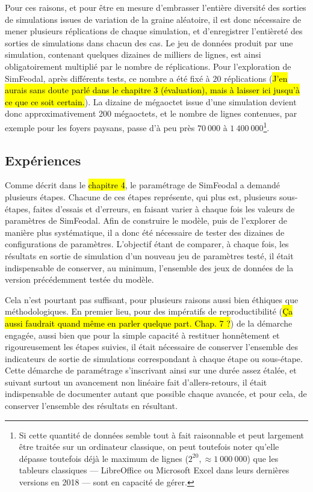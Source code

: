 	Pour ces raisons, et pour être en mesure d'embrasser l'entière diversité des sorties de simulations issues de variation de la graine aléatoire, il est donc nécessaire de mener plusieurs réplications de chaque simulation, et d'enregistrer l'entièreté des sorties de simulations dans chacun des cas.
	Le jeu de données produit par une simulation, contenant quelques dizaines de milliers de lignes, est ainsi obligatoirement multiplié par le nombre de réplications.
	Pour l'exploration de SimFeodal, après différents tests, ce nombre a été fixé à $20$ réplications (\hl{J'en aurais sans doute parlé dans le chapitre 3 (évaluation), mais à laisser ici jusqu'à ce que ce soit certain.}).
	La dizaine de mégaoctet issue d'une simulation devient donc approximativement 200 mégaoctets, et le nombre de lignes contenues, par exemple pour les foyers paysans, passe d'à peu près $70~000$ à $1~400~000$\footnote{
	Si cette quantité de données semble tout à fait raisonnable et peut largement être traitée sur un ordinateur classique, on peut toutefois noter qu'elle dépasse toutefois déjà le maximum de lignes ($2^{20}, \approx 1~000~000$) que les tableurs classiques ---
	LibreOffice ou Microsoft Excel dans leurs dernières versions en 2018
	--- sont en capacité de gérer.  
	}.

	\subsection{Expériences}

	Comme décrit dans le \hl{chapitre 4}, le paramétrage de SimFeodal a demandé plusieurs étapes.
	Chacune de ces étapes représente, qui plus est, plusieurs sous-étapes, faites d'essais et d'erreurs, en faisant varier à chaque fois les valeurs de paramètres de SimFeodal.
	Afin de construire le modèle, puis de l'explorer de manière plus systématique, il a donc été nécessaire de tester des dizaines de configurations de paramètres.
	L'objectif étant de comparer, à chaque fois, les résultats en sortie de simulation d'un nouveau jeu de paramètres testé, il était indispensable de conserver, au minimum, l'ensemble des jeux de données de la version précédemment testée du modèle.
	
	Cela n'est pourtant pas suffisant, pour plusieurs raisons aussi bien éthiques que méthodologiques.
	En premier lieu, pour des impératifs de reproductibilité (\hl{Ça aussi faudrait quand même en parler quelque part. Chap. 7 ?}) de la démarche engagée, aussi bien que pour la simple capacité à restituer honnêtement et rigoureusement les étapes suivies, il était nécessaire de conserver l'ensemble des indicateurs de sortie de simulations correspondant à chaque étape ou sous-étape.
	Cette démarche de paramétrage s'inscrivant ainsi sur une durée assez étalée, et suivant surtout un avancement non linéaire fait d'allers-retours, il était indispensable de documenter autant que possible chaque avancée, et pour cela, de conserver l'ensemble des résultats en résultant.

